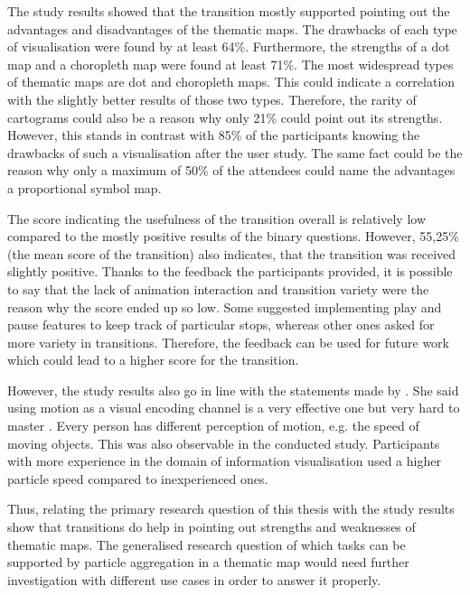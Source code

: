 The study results showed that the transition mostly supported pointing out the advantages and disadvantages of the thematic maps. The drawbacks of each type of visualisation were found by at least 64\%. Furthermore, the strengths of a dot map and a choropleth map were found at least 71\%.
The most widespread types of thematic maps are dot and choropleth maps. This could indicate a correlation with the slightly better results of those two types.
Therefore, the rarity of cartograms could also be a reason why only 21\% could point out its strengths. However, this stands in contrast with 85\% of the participants knowing the drawbacks of such a visualisation after the user study.
The same fact could be the reason  why only a maximum of 50\% of the attendees could name the advantages a proportional symbol map.

The score indicating the usefulness of the transition overall is relatively low compared to the mostly positive results of the binary questions. However, 55,25\% (the mean score of the transition) also indicates, that the transition was received slightly positive. Thanks to the feedback the participants provided, it is possible to say that the lack of animation interaction and transition variety were the reason why the score ended up so low. Some suggested implementing play and pause features to keep track of particular stops, whereas other ones asked for more variety in transitions. Therefore, the feedback can be used for future work which could lead to a higher score for the transition.

However, the study results also go in line with the statements made by \citeauthor{Munzner2014}. She said using motion as a visual encoding channel is a very effective one but very hard to master . Every person has different perception of motion, e.g. the speed of moving objects. This was also observable in the conducted study. Participants with more experience in the domain of information visualisation used a higher particle speed compared to inexperienced ones.

Thus, relating the primary research question of this thesis with the study results show that transitions do help in pointing out strengths and weaknesses of thematic maps. The generalised research question of which tasks can be supported by particle aggregation in a thematic map would need further investigation with different use cases in order to answer it properly.
